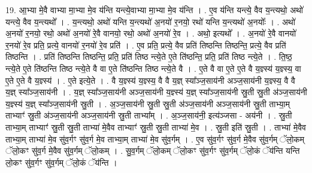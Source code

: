 \documentclass[17pt]{extarticle}
\begin{document}
19. आ॒भ्या मे॒वै वाभ्या मा॒भ्या मे॒व य॑न्ति यन्त्ये॒वाभ्या मा॒भ्या मे॒व य॑न्ति । . ए॒व य॑न्ति यन्त्ये॒ वैव य॒न्त्यथो॒ अथो॑ यन्त्ये॒ वैव य॒न्त्यथो᳚ । . य॒न्त्यथो॒ अथो॑ यन्ति य॒न्त्यथो॑ अ॒नयो॑ र॒नयो॒ रथो॑ यन्ति य॒न्त्यथो॑ अ॒नयोः᳚ । . अथो॑ अ॒नयो॑ र॒नयो॒ रथो॒ अथो॑ अ॒नयो॑ रे॒वै वानयो॒ रथो॒ अथो॑ अ॒नयो॑ रे॒व । . अथो॒ इत्यथो᳚ । . अ॒नयो॑ रे॒वै वानयो॑ र॒नयो॑ रे॒व प्रति॒ प्रत्ये॒ वानयो॑ र॒नयो॑ रे॒व प्रति॑ । . ए॒व प्रति॒ प्रत्ये॒ वैव प्रति॑ तिष्ठन्ति तिष्ठन्ति॒ प्रत्ये॒ वैव प्रति॑ तिष्ठन्ति । . प्रति॑ तिष्ठन्ति तिष्ठन्ति॒ प्रति॒ प्रति॑ तिष्ठ न्त्ये॒ते ए॒ते ति॑ष्ठन्ति॒ प्रति॒ प्रति॑ तिष्ठ न्त्ये॒ते । . ति॒ष्ठ॒ न्त्ये॒ते ए॒ते ति॑ष्ठन्ति तिष्ठ न्त्ये॒ते वै वा ए॒ते ति॑ष्ठन्ति तिष्ठ न्त्ये॒ते वै । . ए॒ते वै वा ए॒ते ए॒ते वै य॒ज्ञ्स्य॑ य॒ज्ञ्स्य॒ वा ए॒ते ए॒ते वै य॒ज्ञ्स्य॑ । . ए॒ते इत्ये॒ते । . वै य॒ज्ञ्स्य॑ य॒ज्ञ्स्य॒ वै वै य॒ज्ञ् स्या᳚ञ्ज॒साय॑नी अञ्ज॒साय॑नी य॒ज्ञ्स्य॒ वै वै य॒ज्ञ् स्या᳚ञ्ज॒साय॑नी । . य॒ज्ञ् स्या᳚ञ्ज॒साय॑नी अञ्ज॒साय॑नी य॒ज्ञ्स्य॑ य॒ज्ञ् स्या᳚ञ्ज॒साय॑नी स्रु॒ती स्रु॒ती अ॑ञ्ज॒साय॑नी य॒ज्ञ्स्य॑ य॒ज्ञ् स्या᳚ञ्ज॒साय॑नी स्रु॒ती । . अ॒ञ्ज॒साय॑नी स्रु॒ती स्रु॒ती अ॑ञ्ज॒साय॑नी अञ्ज॒साय॑नी स्रु॒ती ताभ्या॒म् ताभ्याꣳ॑ स्रु॒ती अ॑ञ्ज॒साय॑नी अञ्ज॒साय॑नी स्रु॒ती ताभ्या᳚म् । . अ॒ञ्ज॒साय॑नी॒ इत्य॑ञ्जसा - अय॑नी । . स्रु॒ती ताभ्या॒म् ताभ्याꣳ॑ स्रु॒ती स्रु॒ती ताभ्या॑ मे॒वैव ताभ्याꣳ॑ स्रु॒ती स्रु॒ती ताभ्या॑ मे॒व । . स्रु॒ती इति॑ स्रु॒ती । . ताभ्या॑ मे॒वैव ताभ्या॒म् ताभ्या॑ मे॒व सु॑व॒र्गꣳ सु॑व॒र्ग मे॒व ताभ्या॒म् ताभ्या॑ मे॒व सु॑व॒र्गम् । . ए॒व सु॑व॒र्गꣳ सु॑व॒र्ग मे॒वैव सु॑व॒र्गम् ॅलो॒कम् ॅलो॒कꣳ सु॑व॒र्ग मे॒वैव सु॑व॒र्गम् ॅलो॒कम् । . सु॒व॒र्गम् ॅलो॒कम् ॅलो॒कꣳ सु॑व॒र्गꣳ सु॑व॒र्गम् ॅलो॒कं ॅय॑न्ति यन्ति लो॒कꣳ सु॑व॒र्गꣳ सु॑व॒र्गम् ॅलो॒कं ॅय॑न्ति । \newline
\end{document}
